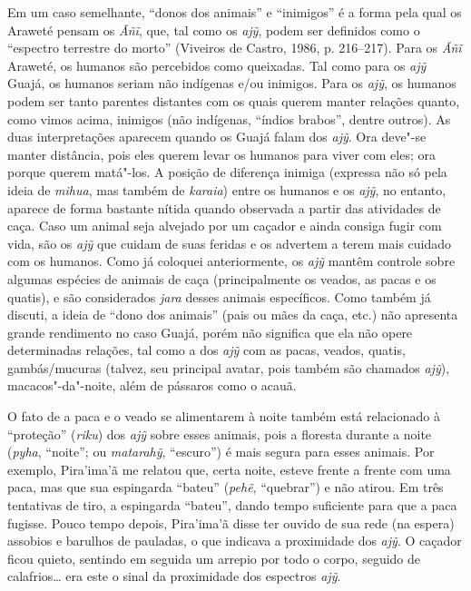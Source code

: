 Em um caso semelhante, ``donos dos animais'' e ``inimigos'' é a forma pela
qual os Araweté pensam os \emph{Ãñĩ}, que, tal como os \emph{ajỹ}, podem
ser definidos como o ``espectro terrestre do morto'' (Viveiros de Castro,
1986, p. 216--217). Para os \emph{Ãñĩ} Araweté, os humanos são percebidos
como queixadas. Tal como para os \emph{ajỹ} Guajá, os humanos seriam não
indígenas e/ou inimigos. Para os \emph{ajỹ}, os humanos podem ser tanto
parentes distantes com os quais querem manter relações quanto, como
vimos acima, inimigos (não indígenas, ``índios brabos'', dentre outros).
As duas interpretações aparecem quando os Guajá falam dos \emph{ajỹ}.
Ora deve"-se manter distância, pois eles querem levar os humanos para
viver com eles; ora porque querem matá"-los. A posição de diferença
inimiga (expressa não só pela ideia de \emph{mihua}, mas também de
\emph{karaia}) entre os humanos e os \emph{ajỹ}, no entanto, aparece de
forma bastante nítida quando observada a partir das atividades de caça.
Caso um animal seja alvejado por um caçador e ainda consiga fugir com
vida, são os \emph{ajỹ} que cuidam de suas feridas e os advertem a terem
mais cuidado com os humanos. Como já coloquei anteriormente, os
\emph{ajỹ} mantêm controle sobre algumas espécies de animais de caça
(principalmente os veados, as pacas e os quatis), e são considerados
\emph{jara} desses animais específicos. Como também já discuti, a ideia
de ``dono dos animais'' (pais ou mães da caça, etc.) não apresenta grande
rendimento no caso Guajá, porém não significa que ela não opere
determinadas relações, tal como a dos \emph{ajỹ} com as pacas, veados,
quatis, gambás/mucuras (talvez, seu principal avatar, pois também são
chamados \emph{ajỹ}), macacos"-da"-noite, além de pássaros como o acauã.

O fato de a paca e o veado se alimentarem à noite também está
relacionado à ``proteção'' (\emph{riku}) dos \emph{ajỹ} sobre esses
animais, pois a floresta durante a noite (\emph{pyha}, ``noite''; ou
\emph{matarahỹ}, ``escuro'') é mais segura para esses animais. Por
exemplo, Pira'ima'ã me relatou que, certa noite, esteve frente a frente
com uma paca, mas que sua espingarda ``bateu'' (\emph{pehẽ}, ``quebrar'') e
não atirou. Em três tentativas de tiro, a espingarda ``bateu'', dando
tempo suficiente para que a paca fugisse. Pouco tempo depois, Pira'ima'ã
disse ter ouvido de sua rede (na espera) assobios e barulhos de
pauladas, o que indicava a proximidade dos \emph{ajỹ}. O caçador ficou
quieto, sentindo em seguida um arrepio por todo o corpo, seguido de
calafrios\ldots{} era este o sinal da proximidade dos espectros \emph{ajỹ}.

